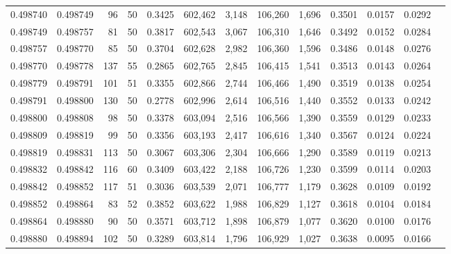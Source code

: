 \begin{tabular}{rrrrrrrrrrrrr}
0.498740 & 0.498749 &    96 &  50 &                                     0.3425 & 602,462 &   3,148 & 106,260 &   1,696 & 0.3501 & 0.0157 & 0.0292 \\
0.498749 & 0.498757 &    81 &  50 &                                     0.3817 & 602,543 &   3,067 & 106,310 &   1,646 & 0.3492 & 0.0152 & 0.0284 \\
0.498757 & 0.498770 &    85 &  50 &                                     0.3704 & 602,628 &   2,982 & 106,360 &   1,596 & 0.3486 & 0.0148 & 0.0276 \\
0.498770 & 0.498778 &   137 &  55 &                                     0.2865 & 602,765 &   2,845 & 106,415 &   1,541 & 0.3513 & 0.0143 & 0.0264 \\
0.498779 & 0.498791 &   101 &  51 &                                     0.3355 & 602,866 &   2,744 & 106,466 &   1,490 & 0.3519 & 0.0138 & 0.0254 \\
0.498791 & 0.498800 &   130 &  50 &                                     0.2778 & 602,996 &   2,614 & 106,516 &   1,440 & 0.3552 & 0.0133 & 0.0242 \\
0.498800 & 0.498808 &    98 &  50 &                                     0.3378 & 603,094 &   2,516 & 106,566 &   1,390 & 0.3559 & 0.0129 & 0.0233 \\
0.498809 & 0.498819 &    99 &  50 &                                     0.3356 & 603,193 &   2,417 & 106,616 &   1,340 & 0.3567 & 0.0124 & 0.0224 \\
0.498819 & 0.498831 &   113 &  50 &                                     0.3067 & 603,306 &   2,304 & 106,666 &   1,290 & 0.3589 & 0.0119 & 0.0213 \\
0.498832 & 0.498842 &   116 &  60 &                                     0.3409 & 603,422 &   2,188 & 106,726 &   1,230 & 0.3599 & 0.0114 & 0.0203 \\
0.498842 & 0.498852 &   117 &  51 &                                     0.3036 & 603,539 &   2,071 & 106,777 &   1,179 & 0.3628 & 0.0109 & 0.0192 \\
0.498852 & 0.498864 &    83 &  52 &                                     0.3852 & 603,622 &   1,988 & 106,829 &   1,127 & 0.3618 & 0.0104 & 0.0184 \\
0.498864 & 0.498880 &    90 &  50 &                                     0.3571 & 603,712 &   1,898 & 106,879 &   1,077 & 0.3620 & 0.0100 & 0.0176 \\
0.498880 & 0.498894 &   102 &  50 &                                     0.3289 & 603,814 &   1,796 & 106,929 &   1,027 & 0.3638 & 0.0095 & 0.0166 \\

\end{tabular}
